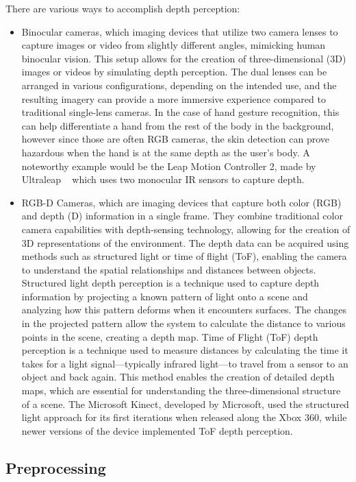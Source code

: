 \documentclass[12pt]{article}
\begin{document}
  There are various ways to accomplish depth perception:
  \begin{itemize}
    \item Binocular cameras, which imaging devices that utilize two camera lenses to capture images or video from slightly different angles, mimicking human binocular vision. This setup allows for the creation of three-dimensional (3D) images or videos by simulating depth perception. The dual lenses can be arranged in various configurations, depending on the intended use, and the resulting imagery can provide a more immersive experience compared to traditional single-lens cameras. In the case of hand gesture recognition, this can help differentiate a hand from the rest of the body in the background, however since those are often RGB cameras, the skin detection can prove hazardous when the hand is at the same depth as the user's body. A noteworthy example would be the Leap Motion Controller 2, made by Ultraleap ~\cite{LEAPMOTION} which uses two monocular IR sensors to capture depth.
    \item RGB-D Cameras, which are imaging devices that capture both color (RGB) and depth (D) information in a single frame. They combine traditional color camera capabilities with depth-sensing technology, allowing for the creation of 3D representations of the environment. The depth data can be acquired using methods such as structured light or time of flight (ToF), enabling the camera to understand the spatial relationships and distances between objects. Structured light depth perception is a technique used to capture depth information by projecting a known pattern of light onto a scene and analyzing how this pattern deforms when it encounters surfaces. The changes in the projected pattern allow the system to calculate the distance to various points in the scene, creating a depth map. Time of Flight (ToF) depth perception is a technique used to measure distances by calculating the time it takes for a light signal—typically infrared light—to travel from a sensor to an object and back again. This method enables the creation of detailed depth maps, which are essential for understanding the three-dimensional structure of a scene. The Microsoft Kinect, developed by Microsoft, used the structured light approach for its first iterations when released along the Xbox 360, while newer versions of the device implemented ToF depth perception.
  \end{itemize}

  \subsection{Preprocessing}
\end{document}
